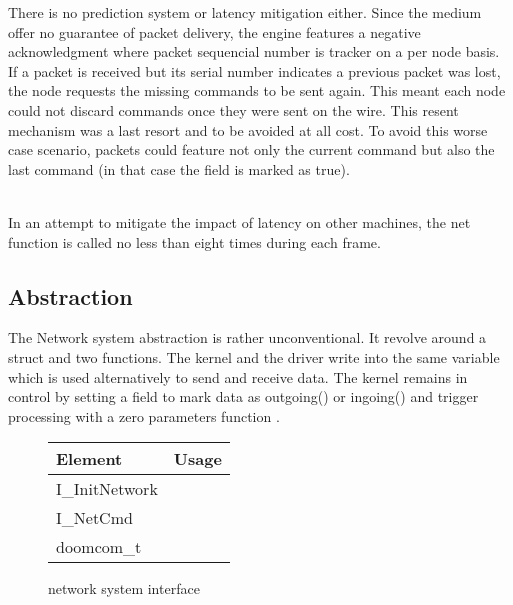 
\par
There is no prediction system or latency mitigation either. Since the medium offer no guarantee of packet delivery, the engine features a negative acknowledgment where packet sequencial number is tracker on a per node basis. If a packet is received but its serial number indicates a previous packet was lost, the node requests the missing commands to be sent again. This meant each node could not discard commands once they were sent on the wire. This resent mechanism was a last resort and to be avoided at all cost. To avoid this worse case scenario, packets could feature not only the current command but also the last command (in that case the field  is marked as true).\\
\\
\par
In an attempt to mitigate the impact of latency on other machines, the net function  is called no less than eight times during each frame.\\
\par
\subsection{Abstraction}
The Network system abstraction is rather unconventional. It revolve around a struct   and two functions. The kernel and the driver write into the same variable which is used alternatively to send and receive data. The kernel remains in control by setting a field  to mark data as outgoing() or ingoing() and trigger processing with a zero parameters function .\\
\par
 \begin{figure}[H]
\centering  
\begin{tabularx}{\textwidth}{ L{0.6}  L{1.4}}
  \toprule
  \textbf{Element} &  \textbf{Usage}\\

  \toprule 
   I\_InitNetwork & \\
   I\_NetCmd & \\
   doomcom\_t & \\
   \toprule
\end{tabularx}
\caption{\doom network system interface}
\end{figure}
\par














